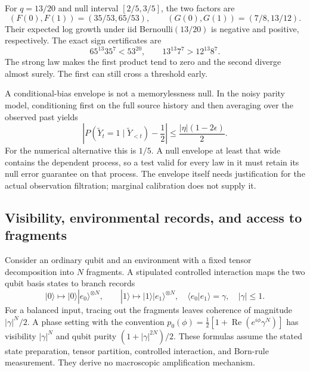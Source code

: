 For \(q=13/20\) and null interval \([2/5,3/5]\), the two factors are
\[
 (F(0),F(1))=(35/53,65/53),\qquad
 (G(0),G(1))=(7/8,13/12).
\]
Their expected log growth under iid Bernoulli\((13/20)\) is negative
and positive, respectively.  The exact sign certificates are
\[
 65^{13}35^7<53^{20},\qquad 13^{13}7^7>12^{13}8^7.
\]
The strong law makes the first product tend to zero and the second
diverge almost surely.  The first can still cross a threshold early.

A conditional-bias envelope is not a memorylessness null.  In the noisy
parity model, conditioning first on the full source history and then
averaging over the observed past yields
\[
 \left|P(\widetilde Y_t=1\mid\widetilde Y_{<t})-\frac12\right|
 \le\frac{|\eta|(1-2\epsilon)}2 .
\]
For the numerical alternative this is \(1/5\).
A null envelope at least that wide contains the dependent process, so
a test valid for every law in it must retain its null error guarantee
on that process.  The envelope itself needs justification for the
actual observation filtration; marginal calibration does not supply it.

\subsection{Visibility, environmental records, and access to fragments}
\label{op:records}

Consider an ordinary qubit and an environment with a fixed tensor
decomposition into \(N\) fragments.  A stipulated controlled interaction
maps the two qubit basis states to branch records
\[
 |0\rangle\longmapsto |0\rangle|e_0\rangle^{\otimes N},\qquad
 |1\rangle\longmapsto |1\rangle|e_1\rangle^{\otimes N},
 \quad \langle e_0|e_1\rangle=\gamma,\quad |\gamma|\le1.
\]
For a balanced input, tracing out the fragments leaves coherence of
magnitude \(|\gamma|^N/2\).  A phase setting with the convention
\(p_0(\phi)=\frac12[1+\operatorname{Re}(e^{i\phi}\gamma^N)]\)
has visibility \(|\gamma|^N\) and qubit purity
\((1+|\gamma|^{2N})/2\).
These formulas assume the stated state preparation, tensor partition,
controlled interaction, and Born-rule measurement.  They derive no
macroscopic amplification mechanism.

